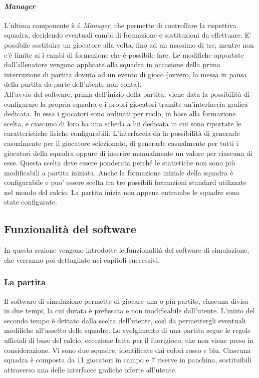 \paragraph{\textit{Manager}} \label{sec:struttura_manager} L'ultima componente è il \textit{Manager}, che permette di controllare la rispettiva squadra, decidendo eventuali cambi di formazione e sostituzioni da effettuare. E' possibile sostituire un giocatore alla volta, fino ad un massimo di tre, mentre non c'è limite ai i cambi di formazione che è possibile fare. Le modifiche apportate dall'allenatore vengono applicate alla squadra in occasione della prima interruzione di partita dovuta ad un evento di gioco (ovvero, la messa in pausa della partita da parte dell'utente non conta).\\

All'avvio del software, prima dell'inizio della partita, viene data la possibilità di configurare la propria squadra e i propri giocatori tramite un'interfaccia grafica dedicata. In essa i giocatori sono ordinati per ruolo, in base alla formazione scelta, e ciascuno di loro ha una scheda a lui dedicata in cui sono riportate le caratteristiche fisiche configurabili. L'interfaccia da la possibilità di generarle casualmente per il giocatore selezionato, di generarle casualmente per tutti i giocatori della squadra oppure di inserire manualmente un valore per ciascuna di esse. Questa scelta deve essere ponderata perché le statistiche non sono più modificabili a partita iniziata. Anche la formazione iniziale della squadra è configurabile e puo' essere scelta fra tre possibili formazioni standard utilizzate nel mondo del calcio. La partita inizia non appena entrambe le squadre sono state configurate.

\subsection{Funzionalità del software}
\label{sec:funzionalita_del_software}

In questa sezione vengono introdotte le funzionalità del software di simulazione, che verranno poi dettagliate nei capitoli successivi.

\subsubsection{La partita}
\label{sec:analisi_partita}

Il software di simulazione permette di giocare una o più partite, ciascuna divisa in due tempi, la cui durata è prefissata e non modificabile dall'utente. L'inizio del secondo tempo è dettato dalla scelta dell'utente, così da permettergli eventuali modifiche all'assetto delle squadre. Lo svolgimento di una partita segue le regole ufficiali di base del calcio, eccezione fatta per il fuorigioco, che non viene preso in considerazione. Vi sono due squadre, identificate dai colori rosso e blu. Ciascuna squadra è composta da 11 giocatori in campo e 7 riserve in panchina, sostituibili attraverso una delle interfacce grafiche offerte all'utente.\\

